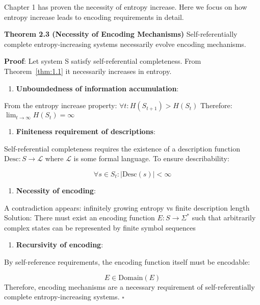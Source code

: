 Chapter 1 has proven the necessity of entropy increase. Here we focus on how entropy increase leads to encoding requirements in detail.

\textbf{Theorem 2.3 (Necessity of Encoding Mechanisms)}
\label{thm:2.3}
Self-referentially complete entropy-increasing systems necessarily evolve encoding mechanisms.

\textbf{Proof}:
Let system S satisfy self-referential completeness. From Theorem~\ref{thm:1.1} it necessarily increases in entropy.

\begin{enumerate}
\item \textbf{Unboundedness of information accumulation}:
\end{enumerate}
   From the entropy increase property: $\forall t: H(S_{t+1}) > H(S_t)$
   Therefore: $\lim_{t \to \infty} H(S_t) = \infty$
   
\begin{enumerate}
\item \textbf{Finiteness requirement of descriptions}:
\end{enumerate}
   Self-referential completeness requires the existence of a description function $\text{Desc}: S \to \mathcal{L}$
   where $\mathcal{L}$ is some formal language. To ensure describability:
   
\begin{equation}
\forall s \in S_t: |\text{Desc}(s)| < \infty
\end{equation}

\begin{enumerate}
\item \textbf{Necessity of encoding}:
\end{enumerate}
   A contradiction appears: infinitely growing entropy vs finite description length
   Solution: There must exist an encoding function $E: S \to \Sigma^*$
   such that arbitrarily complex states can be represented by finite symbol sequences
   
\begin{enumerate}
\item \textbf{Recursivity of encoding}:
\end{enumerate}
   By self-reference requirements, the encoding function itself must be encodable:
   
\begin{equation}
E \in \text{Domain}(E)
\end{equation}
Therefore, encoding mechanisms are a necessary requirement of self-referentially complete entropy-increasing systems. $\square$

